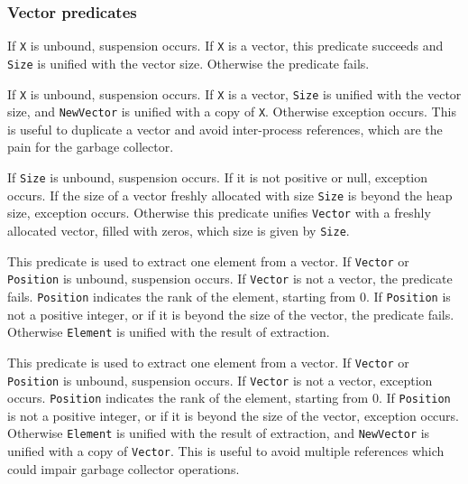 \subsubsection{Vector predicates}
\begin{itemize}

If \verb|X| is unbound, suspension occurs. If \verb|X| is a vector,
this predicate succeeds and \verb|Size| is unified with the vector size.
Otherwise the predicate fails.

If \verb|X| is unbound, suspension occurs. If \verb|X| is a vector,
\verb|Size| is unified with the vector size, and
\verb|NewVector| is unified with a copy of \verb|X|.
Otherwise exception occurs.
This is useful to duplicate a vector and avoid
inter-process references, which are the pain for the garbage collector.

If \verb|Size| is unbound, suspension occurs.
If it is not positive or null, exception occurs.
If the size of a vector freshly allocated with size \verb|Size|
is beyond the heap size, exception occurs.
Otherwise this predicate unifies \verb|Vector| with a freshly allocated vector,
filled with zeros, which size is given by \verb|Size|.

This predicate is used to extract one element from a vector. 
If \verb|Vector| or \verb|Position| is unbound, suspension occurs.
If \verb|Vector| is not a vector, the predicate fails.
\verb|Position| indicates the rank of the element, starting from 0.
If \verb|Position| is not a positive integer, 
or if it is beyond the size of the vector, the predicate fails.
Otherwise \verb|Element| is unified with the result of extraction.

This predicate is used to extract one element from a vector. 
If \verb|Vector| or \verb|Position| is unbound, suspension occurs.
If \verb|Vector| is not a vector, exception occurs.
\verb|Position| indicates the rank of the element, starting from 0.
If \verb|Position| is not a positive integer, 
or if it is beyond the size of the vector, exception occurs.
Otherwise \verb|Element| is unified with the result of extraction,
and \verb|NewVector| is unified with a copy of \verb|Vector|.
This is useful to avoid multiple references which could impair garbage
collector operations.


\end{itemize}
